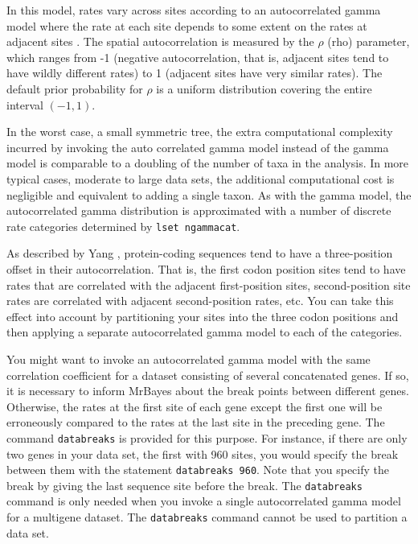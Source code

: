 \documentclass[12pt]{book}
\newcommand{\ttt}[1]{\texttt{#1}}
\begin{document}
In this model, rates vary across sites according to an autocorrelated gamma model where the rate at
each site depends to some extent on the rates at adjacent sites \citep{yang95a}. The spatial
autocorrelation is measured by the $\rho$ (rho) parameter, which ranges from -1 (negative
autocorrelation, that is, adjacent sites tend to have wildly different rates) to 1 (adjacent sites
have very similar rates). The default prior probability for $\rho$ is a uniform distribution
covering the entire interval $(-1,1)$.

In the worst case, a small symmetric tree, the extra computational complexity incurred by invoking
the auto correlated gamma model instead of the gamma model is comparable to a doubling of the
number of taxa in the analysis. In more typical cases, moderate to large data sets, the additional
computational cost is negligible and equivalent to adding a single taxon. As with the gamma model,
the autocorrelated gamma distribution is approximated with a number of discrete rate categories
determined by \ttt{lset ngammacat}.

As described by Yang \citep{yang95a}, protein-coding sequences tend to have a three-position offset
in their autocorrelation. That is, the first codon position sites tend to have rates that are
correlated with the adjacent first-position sites, second-position site rates are correlated with
adjacent second-position rates, etc. You can take this effect into account by partitioning your
sites into the three codon positions and then applying a separate autocorrelated gamma model to
each of the categories.

You might want to invoke an autocorrelated gamma model with the same correlation coefficient for a
dataset consisting of several concatenated genes. If so, it is necessary to inform MrBayes about
the break points between different genes. Otherwise, the rates at the first site of each gene
except the first one will be erroneously compared to the rates at the last site in the preceding
gene. The command \ttt{databreaks} is provided for this purpose. For instance, if there are only
two genes in your data set, the first with 960 sites, you would specify the break between them with
the statement \ttt{databreaks 960}. Note that you specify the break by giving the last sequence
site before the break. The \ttt{databreaks} command is only needed when you invoke a single
autocorrelated gamma model for a multigene dataset. The \ttt{databreaks} command cannot be used to
partition a data set.
\end{document}
